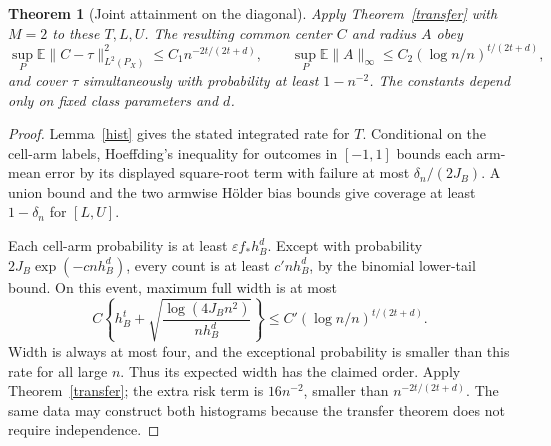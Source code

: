 \documentclass[11pt]{article}
\newtheorem{theorem}{Theorem}
\theoremstyle{remark}
\newcommand{\E}{\mathbb E}
\begin{document}
\begin{theorem}[Joint attainment on the diagonal]\label{joint}
Apply Theorem~\ref{transfer} with $M=2$ to these $T,L,U$. The resulting common center $C$ and radius $A$ obey
\[
 \sup_P\E\|C-\tau\|_{L^2(P_X)}^2\leq C_1 n^{-2t/(2t+d)},
 \qquad
 \sup_P\E\|A\|_\infty\leq C_2(\log n/n)^{t/(2t+d)},
\]
and cover $\tau$ simultaneously with probability at least $1-n^{-2}$.
The constants depend only on fixed class parameters and $d$.
\end{theorem}
\begin{proof}
Lemma~\ref{hist} gives the stated integrated rate for $T$. Conditional on the cell-arm labels, Hoeffding's inequality for outcomes in $[-1,1]$ bounds each arm-mean error by its displayed square-root term with failure at most $\delta_n/(2J_B)$. A union bound and the two armwise H\"older bias bounds give coverage at least $1-\delta_n$ for $[L,U]$.

Each cell-arm probability is at least $\varepsilon f_*h_B^d$. Except with probability $2J_B\exp(-cnh_B^d)$, every count is at least $c'nh_B^d$, by the binomial lower-tail bound. On this event, maximum full width is at most
\[
 C\left\{h_B^t+
      \sqrt{\frac{\log(4J_Bn^2)}{nh_B^d}}\right\}
 \leq C'(\log n/n)^{t/(2t+d)}.
\]
Width is always at most four, and the exceptional probability is smaller than this rate for all large $n$. Thus its expected width has the claimed order. Apply Theorem~\ref{transfer}; the extra risk term is $16n^{-2}$, smaller than $n^{-2t/(2t+d)}$. The same data may construct both histograms because the transfer theorem does not require independence.
\end{proof}
\end{document}
